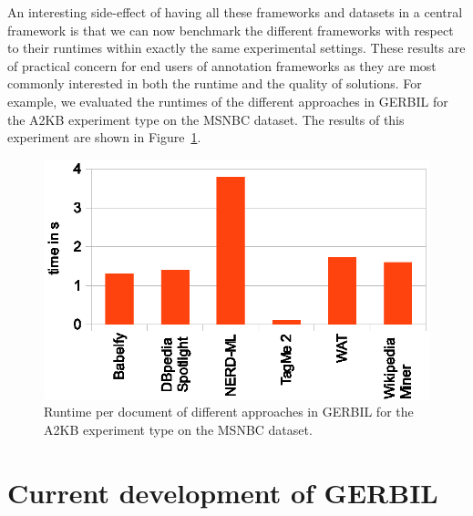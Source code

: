 An interesting side-effect of having all these frameworks and datasets in a central framework is that we can now benchmark the different frameworks with respect to their runtimes within exactly the same experimental settings. These results are of practical concern for end users of annotation frameworks as they are most commonly interested in both the runtime and the quality of solutions. For example, we evaluated the runtimes of the different approaches in GERBIL for the A2KB experiment type on the MSNBC dataset. The results of this experiment are shown in Figure~\ref{fig:runtime}.


\begin{figure}[htb!]
\centering
\includegraphics[width=\columnwidth]{part_02/benchmarking/WWW_GERBIL/needed_times.eps}
\caption{Runtime per document of different approaches in GERBIL for the A2KB experiment type on the MSNBC dataset.}
\label{fig:runtime}
\end{figure}

\section{Current development of GERBIL}
\label{sec:currentNumbersForGERBIL}

